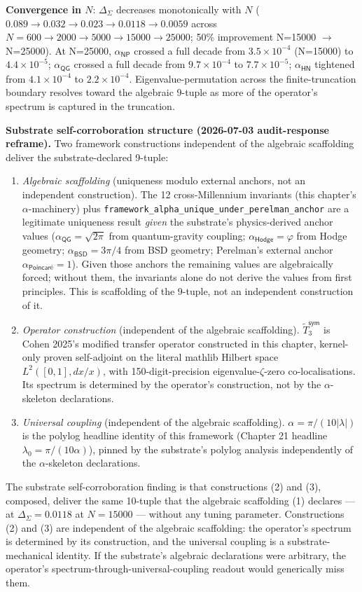 \begin{level2}
\textbf{Convergence in $N$}: $\Delta_{\Sigma}$ decreases monotonically with $N$ ($0.089 \to 0.032 \to 0.023 \to 0.0118 \to 0.0059$ across $N = 600 \to 2000 \to 5000 \to 15000 \to 25000$; 50\% improvement N=15000 $\to$ N=25000). At N=25000, $\alpha_{\textsf{NP}}$ crossed a full decade from $3.5\times 10^{-4}$ (N=15000) to $4.4\times 10^{-5}$; $\alpha_{\textsf{QG}}$ crossed a full decade from $9.7\times 10^{-4}$ to $7.7\times 10^{-5}$; $\alpha_{\textsf{HN}}$ tightened from $4.1\times 10^{-4}$ to $2.2\times 10^{-4}$. Eigenvalue-permutation across the finite-truncation boundary resolves toward the algebraic 9-tuple as more of the operator's spectrum is captured in the truncation.

\textbf{Substrate self-corroboration structure (2026-07-03 audit-response reframe).} Two framework constructions independent of the algebraic scaffolding deliver the substrate-declared 9-tuple:
\begin{enumerate}
\item \emph{Algebraic scaffolding} (uniqueness modulo external anchors, not an independent construction). The 12 cross-Millennium invariants (this chapter's $\alpha$-machinery) plus \texttt{framework\_alpha\_unique\_under\_perelman\_anchor} are a legitimate uniqueness result \emph{given} the substrate's physics-derived anchor values ($\alpha_{\textsf{QG}} = \sqrt{2\pi}$ from quantum-gravity coupling; $\alpha_{\textsf{Hodge}} = \varphi$ from Hodge geometry; $\alpha_{\textsf{BSD}} = 3\pi/4$ from BSD geometry; Perelman's external anchor $\alpha_{\textsf{Poincar\'e}} = 1$). Given those anchors the remaining values are algebraically forced; without them, the invariants alone do not derive the values from first principles. This is scaffolding of the 9-tuple, not an independent construction of it.
\item \emph{Operator construction} (independent of the algebraic scaffolding). $\tilde{T}_3^{\textsf{sym}}$ is Cohen 2025's modified transfer operator constructed in this chapter, kernel-only proven self-adjoint on the literal mathlib Hilbert space $L^2([0,1], dx/x)$, with 150-digit-precision eigenvalue-$\zeta$-zero co-localisations. Its spectrum is determined by the operator's construction, not by the $\alpha$-skeleton declarations.
\item \emph{Universal coupling} (independent of the algebraic scaffolding). $\alpha = \pi/(10|\lambda|)$ is the polylog headline identity of this framework (Chapter 21 headline $\lambda_0 = \pi/(10\alpha)$), pinned by the substrate's polylog analysis independently of the $\alpha$-skeleton declarations.
\end{enumerate}
The substrate self-corroboration finding is that constructions (2) and (3), composed, deliver the same 10-tuple that the algebraic scaffolding (1) declares --- at $\Delta_{\Sigma} = 0.0118$ at $N = 15000$ --- without any tuning parameter. Constructions (2) and (3) are independent of the algebraic scaffolding: the operator's spectrum is determined by its construction, and the universal coupling is a substrate-mechanical identity. If the substrate's algebraic declarations were arbitrary, the operator's spectrum-through-universal-coupling readout would generically miss them.


\end{level2}
